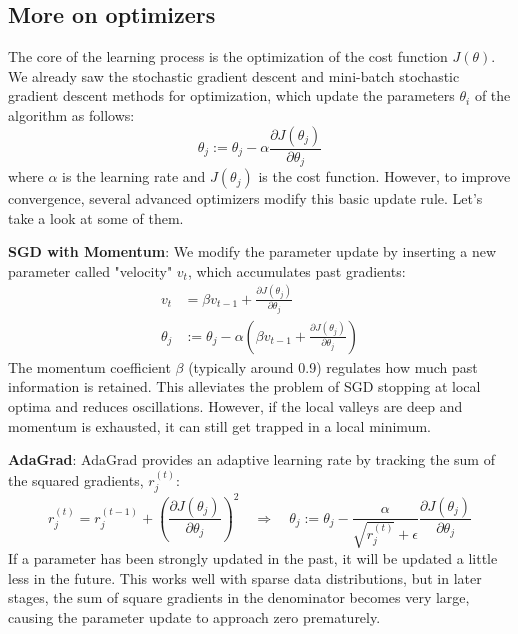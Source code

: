 \subsection{More on optimizers}
The core of the learning process is the optimization of the cost function $J(\theta)$. We already saw the stochastic gradient descent and mini-batch stochastic gradient descent methods for optimization, which update the parameters $\theta_i$ of the algorithm as follows:
\begin{equation}
    \theta_j:=\theta_j - \alpha \dfrac{\partial J(\theta_j)}{\partial\theta_j}
\end{equation}
where $\alpha$ is the learning rate and $J(\theta_j)$ is the cost function.
However, to improve convergence, several advanced optimizers modify this basic update rule. Let's take a look at some of them.

\textbf{SGD with Momentum}:
We modify the parameter update by inserting a new parameter called "velocity" $v_t$, which accumulates past gradients:
\begin{equation}
\begin{aligned}
    v_t &= \beta v_{t-1} + \frac{\partial J(\theta_j)}{\partial \theta_j} \\
    \theta_j &:= \theta_j - \alpha \left( \beta v_{t-1} + \frac{\partial J(\theta_j)}{\partial \theta_j} \right)
\end{aligned}
\end{equation}
The momentum coefficient $\beta$ (typically around 0.9) regulates how much past information is retained. This alleviates the problem of SGD stopping at local optima and reduces oscillations. However, if the local valleys are deep and momentum is exhausted, it can still get trapped in a local minimum.

\textbf{AdaGrad}:
AdaGrad provides an adaptive learning rate by tracking the sum of the squared gradients, $r_j^{(t)}$:
\begin{equation}
    r_j^{(t)} = r_j^{(t-1)} + \left(\frac{\partial J(\theta_j)}{\partial \theta_j}\right)^2 \quad \Longrightarrow \quad \theta_j := \theta_j - \frac{\alpha}{\sqrt{r_j^{(t)}} + \epsilon} \frac{\partial J(\theta_j)}{\partial \theta_j}
\end{equation}
If a parameter has been strongly updated in the past, it will be updated a little less in the future. This works well with sparse data distributions, but in later stages, the sum of square gradients in the denominator becomes very large, causing the parameter update to approach zero prematurely.

